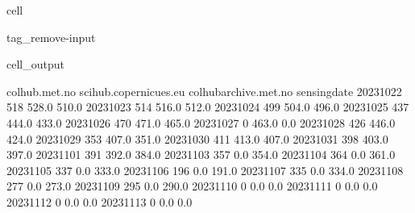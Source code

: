 \documentclass[letterpaper,10pt,english]{jupyterBook}
\begin{document}
\begin{sphinxuseclass}{cell}
\begin{sphinxuseclass}{tag_remove-input}\begin{sphinxVerbatimOutput}

\begin{sphinxuseclass}{cell_output}
\begin{sphinxVerbatim}[commandchars=\\\{\}]
              colhub.met.no  scihub.copernicues.eu  colhub\PYGZhy{}archive.met.no  \PYGZbs{}
sensing\PYGZus{}date                                                                
2023\PYGZhy{}10\PYGZhy{}22              518                  528.0                  510.0   
2023\PYGZhy{}10\PYGZhy{}23              514                  516.0                  512.0   
2023\PYGZhy{}10\PYGZhy{}24              499                  504.0                  496.0   
2023\PYGZhy{}10\PYGZhy{}25              437                  444.0                  433.0   
2023\PYGZhy{}10\PYGZhy{}26              470                  471.0                  465.0   
2023\PYGZhy{}10\PYGZhy{}27                0                  463.0                    0.0   
2023\PYGZhy{}10\PYGZhy{}28              426                  446.0                  424.0   
2023\PYGZhy{}10\PYGZhy{}29              353                  407.0                  351.0   
2023\PYGZhy{}10\PYGZhy{}30              411                  413.0                  407.0   
2023\PYGZhy{}10\PYGZhy{}31              398                  403.0                  397.0   
2023\PYGZhy{}11\PYGZhy{}01              391                  392.0                  384.0   
2023\PYGZhy{}11\PYGZhy{}03              357                    0.0                  354.0   
2023\PYGZhy{}11\PYGZhy{}04              364                    0.0                  361.0   
2023\PYGZhy{}11\PYGZhy{}05              337                    0.0                  333.0   
2023\PYGZhy{}11\PYGZhy{}06              196                    0.0                  191.0   
2023\PYGZhy{}11\PYGZhy{}07              335                    0.0                  334.0   
2023\PYGZhy{}11\PYGZhy{}08              277                    0.0                  273.0   
2023\PYGZhy{}11\PYGZhy{}09              295                    0.0                  290.0   
2023\PYGZhy{}11\PYGZhy{}10                0                    0.0                    0.0   
2023\PYGZhy{}11\PYGZhy{}11                0                    0.0                    0.0   
2023\PYGZhy{}11\PYGZhy{}12                0                    0.0                    0.0   
2023\PYGZhy{}11\PYGZhy{}13                0                    0.0                    0.0   

\end{sphinxVerbatim}
\end{sphinxuseclass}
\end{sphinxVerbatimOutput}
\end{sphinxuseclass}
\end{sphinxuseclass}
\end{document}

